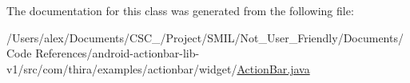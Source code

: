 The documentation for this class was generated from the following file\-:\begin{DoxyCompactItemize}
\item 
/\-Users/alex/\-Documents/\-C\-S\-C\-\_/\-Project/\-S\-M\-I\-L/\-Not\-\_\-\-User\-\_\-\-Friendly/\-Documents/\-Code References/android-\/actionbar-\/lib-\/v1/src/com/thira/examples/actionbar/widget/\hyperlink{_documents_2_code_01_references_2android-actionbar-lib-v1_2src_2com_2thira_2examples_2actionbar_2widget_2_action_bar_8java}{Action\-Bar.\-java}\end{DoxyCompactItemize}
